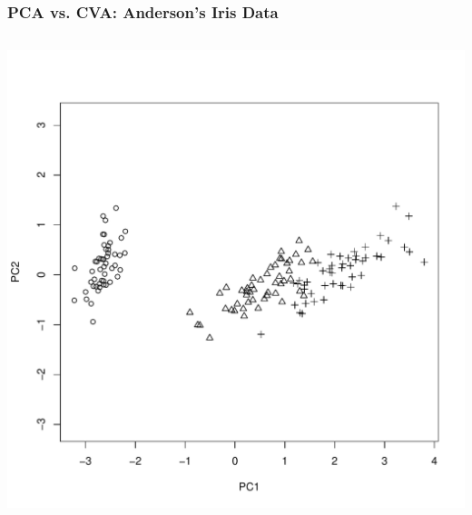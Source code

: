 \documentclass{beamer}
\begin{document}
%
%


\begin{frame}
  \frametitle{PCA vs. CVA: Anderson's Iris Data}

\begin{columns}

\begin{column}{0.5\textwidth}
\begin{center}
\includegraphics[width=\textwidth]{iris-PCA}
\end{center}
\end{column}


\end{columns}
\end{frame}
\end{document}
